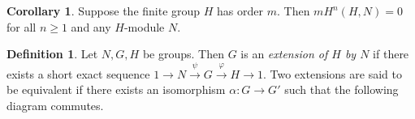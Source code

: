 \documentclass{article}
\theoremstyle{definition}
\newtheorem{defn}[theorem]{Definition}
\newtheorem{cor}[theorem]{Corollary}
\begin{document}
\begin{cor}
    Suppose the finite group $H$ has order $m$. Then $m H^n(H,N) = 0$ for all $n \geq 1$ and any $H$-module $N$. 
\end{cor}



\begin{defn}
Let $N, G, H$ be groups. Then $G$ is an \emph{extension of $H$ by $N$} if there exists a short exact sequence $1 \rightarrow N \overset{\psi}{\rightarrow} G \overset{\varphi}{\rightarrow} H \rightarrow 1$. Two extensions are said to be equivalent if there exists an isomorphism $\alpha : G \to G'$ such that the following diagram commutes. 
\begin{center}
\end{center}



\end{defn}
\end{document}
